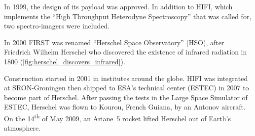 In 1999, the design of its payload was approved.
In addition to HIFI, which implements the ``High Throughput Heterodyne Spectroscopy'' that was called for, two spectro-imagers were included.

In 2000 FIRST was renamed ``Herschel Space Observatory'' (HSO), after Friedrich Wilhelm Herschel who discovered the existence of infrared radiation in 1800 (\cref{fig:herschel_discovers_infrared}).

Construction started in 2001 in institutes around the globe.
HIFI was integrated at SRON-Groningen then shipped to ESA's technical center (ESTEC) in 2007 to become part of Herschel.
After passing the tests in the Large Space Simulator of ESTEC, Herschel was flown to Kourou, French Guiana, by an Antonov aircraft.
On the 14\textsuperscript{th} of May 2009, an Ariane~5 rocket lifted Herschel out of Earth's atmosphere.

